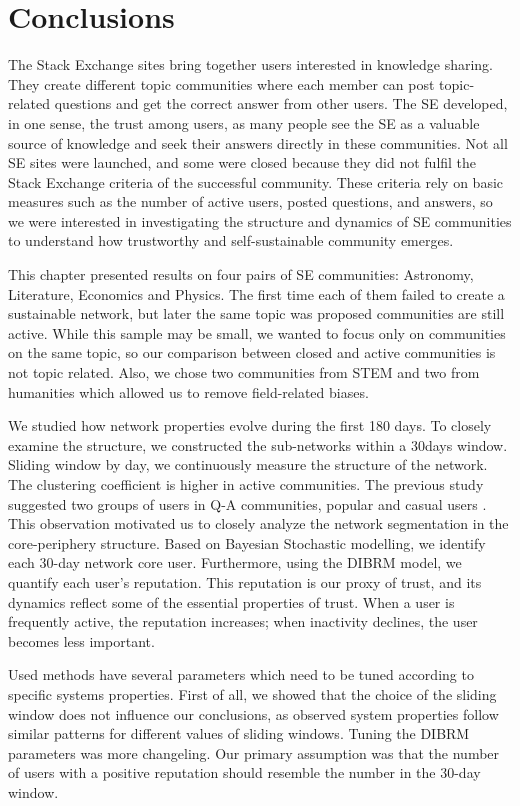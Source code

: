 \section{Conclusions}

The Stack Exchange sites bring together users interested in knowledge sharing. They create different topic communities where each member can post topic-related questions and get the correct answer from other users. The SE developed, in one sense, the trust among users, as many people see the SE as a valuable source of knowledge and seek their answers directly in these communities. Not all SE sites were launched, and some were closed because they did not fulfil the Stack Exchange criteria of the successful community. These criteria rely on basic measures such as the number of active users, posted questions, and answers, so we were interested in investigating the structure and dynamics of SE communities to understand how trustworthy and self-sustainable community emerges. 

This chapter presented results on four pairs of SE communities: Astronomy, Literature, Economics and Physics. The first time each of them failed to create a sustainable network, but later the same topic was proposed communities are still active. While this sample may be small, we wanted to focus only on communities on the same topic, so our comparison between closed and active communities is not topic related. Also, we chose two communities from STEM and two from humanities which allowed us to remove field-related biases. 

We studied how network properties evolve during the first 180 days. To closely examine the structure, we constructed the sub-networks within a 30days window. Sliding window by day, we continuously measure the structure of the network. The clustering coefficient is higher in active communities. The previous study suggested two groups of users in Q-A communities, popular and casual users \cite{santos2019self}. This observation motivated us to closely analyze the network segmentation in the core-periphery structure. Based on Bayesian Stochastic modelling, we identify each 30-day network core user.
Furthermore, using the DIBRM model\cite{melnikov2018toward}, we quantify each user's reputation. This reputation is our proxy of trust, and its dynamics reflect some of the essential properties of trust. When a user is frequently active, the reputation increases; when inactivity declines, the user becomes less important.   

Used methods have several parameters which need to be tuned according to specific systems properties. First of all, we showed that the choice of the sliding window does not influence our conclusions, as observed system properties follow similar patterns for different values of sliding windows. Tuning the DIBRM parameters was more changeling. Our primary assumption was that the number of users with a positive reputation should resemble the number in the 30-day window.

